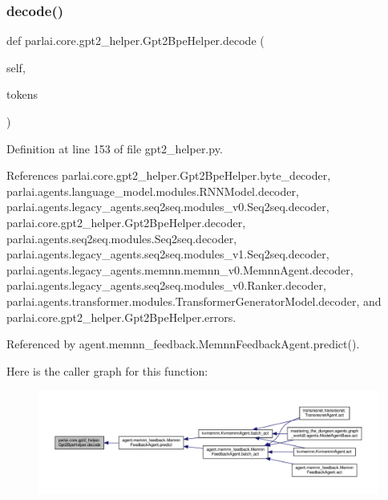 \subsubsection{\texorpdfstring{decode()}{decode()}}
{\footnotesize\ttfamily def parlai.\+core.\+gpt2\+\_\+helper.\+Gpt2\+Bpe\+Helper.\+decode (\begin{DoxyParamCaption}\item[{}]{self,  }\item[{}]{tokens }\end{DoxyParamCaption})}



Definition at line 153 of file gpt2\+\_\+helper.\+py.



References parlai.\+core.\+gpt2\+\_\+helper.\+Gpt2\+Bpe\+Helper.\+byte\+\_\+decoder, parlai.\+agents.\+language\+\_\+model.\+modules.\+R\+N\+N\+Model.\+decoder, parlai.\+agents.\+legacy\+\_\+agents.\+seq2seq.\+modules\+\_\+v0.\+Seq2seq.\+decoder, parlai.\+core.\+gpt2\+\_\+helper.\+Gpt2\+Bpe\+Helper.\+decoder, parlai.\+agents.\+seq2seq.\+modules.\+Seq2seq.\+decoder, parlai.\+agents.\+legacy\+\_\+agents.\+seq2seq.\+modules\+\_\+v1.\+Seq2seq.\+decoder, parlai.\+agents.\+legacy\+\_\+agents.\+memnn.\+memnn\+\_\+v0.\+Memnn\+Agent.\+decoder, parlai.\+agents.\+legacy\+\_\+agents.\+seq2seq.\+modules\+\_\+v0.\+Ranker.\+decoder, parlai.\+agents.\+transformer.\+modules.\+Transformer\+Generator\+Model.\+decoder, and parlai.\+core.\+gpt2\+\_\+helper.\+Gpt2\+Bpe\+Helper.\+errors.



Referenced by agent.\+memnn\+\_\+feedback.\+Memnn\+Feedback\+Agent.\+predict().

Here is the caller graph for this function\+:
\nopagebreak
\begin{figure}[H]
\begin{center}
\leavevmode
\includegraphics[width=350pt]{classparlai_1_1core_1_1gpt2__helper_1_1Gpt2BpeHelper_a54e448f943687a8afe9bcc97741d06b9_icgraph}
\end{center}
\end{figure}
\mbox{\label{classparlai_1_1core_1_1gpt2__helper_1_1Gpt2BpeHelper_a7c5c94aa8d5acd15215cf3e45fc9f2c3}} 
